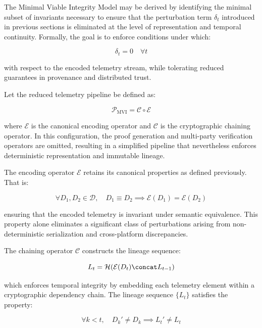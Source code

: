 The Minimal Viable Integrity Model may be derived by identifying the minimal subset of invariants necessary to ensure that the perturbation term $\delta_t$ introduced in previous sections is eliminated at the level of representation and temporal continuity. Formally, the goal is to enforce conditions under which:

\begin{equation}
\delta_t = 0 \quad \forall t
\end{equation}

with respect to the encoded telemetry stream, while tolerating reduced guarantees in provenance and distributed trust.

Let the reduced telemetry pipeline be defined as:

\begin{equation}
\mathcal{P}_{\text{MVI}} = \mathcal{C} \circ \mathcal{E}
\end{equation}

where $\mathcal{E}$ is the canonical encoding operator and $\mathcal{C}$ is the cryptographic chaining operator. In this configuration, the proof generation and multi-party verification operators are omitted, resulting in a simplified pipeline that nevertheless enforces deterministic representation and immutable lineage.

The encoding operator $\mathcal{E}$ retains its canonical properties as defined previously. That is:

\begin{equation}
\forall D_1, D_2 \in \mathcal{D}, \quad D_1 \equiv D_2 \implies \mathcal{E}(D_1) = \mathcal{E}(D_2)
\end{equation}

ensuring that the encoded telemetry is invariant under semantic equivalence. This property alone eliminates a significant class of perturbations arising from non-deterministic serialization and cross-platform discrepancies.

The chaining operator $\mathcal{C}$ constructs the lineage sequence:

\begin{equation}
L_t = \mathcal{H}(\mathcal{E}(D_t) \concat L_{t-1})
\end{equation}

which enforces temporal integrity by embedding each telemetry element within a cryptographic dependency chain. The lineage sequence $\{L_t\}$ satisfies the property:

\begin{equation}
\forall k < t, \quad D_k' \neq D_k \implies L_t' \neq L_t
\end{equation}

